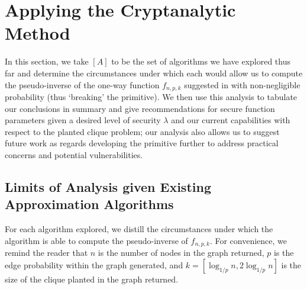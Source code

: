 \documentclass{article}
\theoremstyle{definition}
\begin{document}
\section{Applying the Cryptanalytic Method}

In this section, we take $[A]$ to be the set of algorithms we have explored 
thus far and determine the circumstances under which each would allow us to 
compute the pseudo-inverse of  the one-way function $f_{n,p,k}$ suggested in 
\cite{HidingCliques} with non-negligible probability (thus `breaking' the primitive).
We then use this analysis to tabulate our conclusions in summary and give 
recommendations for secure function parameters given a desired level of 
security $\lambda$ and our current capabilities with respect to the planted clique 
problem; our analysis also allows us to suggest future work as regards 
developing the primitive further to address practical concerns and potential 
vulnerabilities.

\subsection{Limits of Analysis given Existing Approximation Algorithms}

For each algorithm explored, we distill the circumstances under which the 
algorithm is able to compute the pseudo-inverse of $f_{n,p,k}$.  For convenience, 
we remind the reader that $n$ is the number of nodes in the graph returned, 
$p$ is the edge probability within the graph generated, and 
$k = [\log_{1/p}{n}, 2\log_{1/p}{n}]$ is the size of the clique planted in the graph returned.
\end{document}
